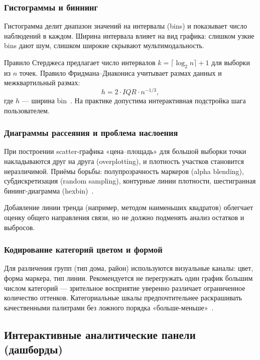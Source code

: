 \subsubsection{Гистограммы и биннинг}

Гистограмма делит диапазон значений на интервалы (bins) и показывает число наблюдений в каждом. Ширина интервала влияет на вид графика: слишком узкие bins дают шум, слишком широкие скрывают мультимодальность.

Правило Стерджеса предлагает число интервалов $k = \lceil \log_2 n \rceil + 1$ для выборки из $n$ точек. Правило Фридмана--Диакониса учитывает размах данных и межквартильный размах:
\begin{equation}
    h = 2 \cdot IQR \cdot n^{-1/3},
    \label{eq:fd}
\end{equation}
где $h$ --- ширина bin~\cite{grus2021}. На практике допустима интерактивная подстройка шага пользователем.

\subsubsection{Диаграммы рассеяния и проблема наслоения}

При построении scatter-графика «цена--площадь» для большой выборки точки накладываются друг на друга (overplotting), и плотность участков становится неразличимой. Приёмы борьбы: полупрозрачность маркеров (alpha blending), субдискретизация (random sampling), контурные линии плотности, шестигранная бининг-диаграмма (hexbin)~\cite{mckinney2023}.

Добавление линии тренда (например, методом наименьших квадратов) облегчает оценку общего направления связи, но не должно подменять анализ остатков и выбросов.

\subsubsection{Кодирование категорий цветом и формой}

Для различения групп (тип дома, район) используются визуальные каналы: цвет, форма маркера, тип линии. Рекомендуется не перегружать один график большим числом категорий --- зрительное восприятие уверенно различает ограниченное количество оттенков. Категориальные шкалы предпочтительнее раскрашивать качественными палитрами без ложного порядка «больше-меньше»~\cite{monarch2022}.

\subsection{Интерактивные аналитические панели (дашборды)}

